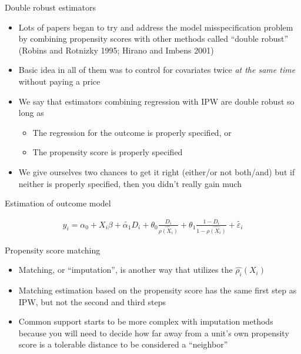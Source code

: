 \documentclass{beamer}
\begin{document}
\begin{frame}{Double robust estimators}

\begin{itemize}
\item Lots of papers began to try and address the model misspecification problem by combining propensity scores with other methods called ``double robust'' (Robins and Rotnizky 1995; Hirano and Imbens 2001)
\item Basic idea in all of them was to control for covariates twice \emph{at the same time} without paying a price
\item We say that estimators combining regression with IPW are double robust so long as
	\begin{itemize}
	\item The regression for the outcome is properly specified, or
	\item The propensity score is properly specified
	\end{itemize}
\item We give ourselves two chances to get it right (either/or not both/and) but if neither is properly specified, then you didn't really gain much
\end{itemize}

\end{frame}



\begin{frame}{Estimation of outcome model}

\begin{eqnarray*}
y_i = \alpha_0 + X_i\beta + \tilde{\alpha_1} D_i + \theta_0 \frac{D_i}{\widehat{\rho (X_i)}} + \theta_1 \frac{1-D_i}{1- \widehat{\rho (X_i)}} + \tilde{\varepsilon_i}
\end{eqnarray*}

\end{frame}


\begin{frame}{Propensity score matching}
	
	\begin{itemize}
	\item Matching, or ``imputation'', is another way that utilizes the $\widehat{\rho_i}(X_i)$
	\item Matching estimation based on the propensity score has the same first step as IPW, but not the second and third steps
	\item Common support starts to be more complex with imputation methods because you will need to decide how far away from a unit's own propensity score is a tolerable distance to be considered a ``neighbor''
	\end{itemize}

\end{frame}
\end{document}
